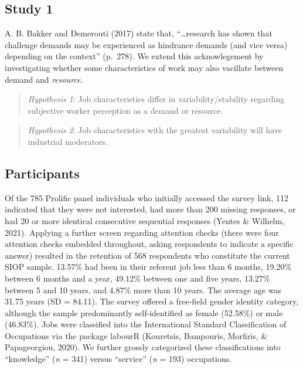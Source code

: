 \documentclass[
  english,
  man]{apa6}
\begin{document}
\hypertarget{study-1}{%
\subsection{Study 1}\label{study-1}}

A. B. Bakker and Demerouti (2017) state that, ``\ldots research has shown that challenge demands may be experienced as hindrance demands (and vice versa) depending on the context'' (p.~278). We extend this acknowlegement by investigating whether some characteristics of work may also vacillate between demand and \emph{resource}.

\begin{quote}
\emph{Hypothesis 1}: Job characteristics differ in variability/stability regarding subjective worker perception as a demand or resource.
\end{quote}

\begin{quote}
\emph{Hypothesis 2}: Job characteristics with the greatest variability will have industrial moderators.
\end{quote}

\hypertarget{participants}{%
\subsection{Participants}\label{participants}}

Of the 785 Prolific panel individuals who initially accessed the survey link, 112 indicated that they were not interested, had more than 200 missing responses, or had 20 or more identical consecutive sequential responses (Yentes \& Wilhelm, 2021). Applying a further screen regarding attention checks (there were four attention checks embedded throughout, asking respondents to indicate a specific answer) resulted in the retention of 568 respondents who constitute the current SIOP sample. 13.57\% had been in their referent job less than 6 months, 19.20\% between 6 months and a year, 49.12\% between one and five years, 13.27\% between 5 and 10 years, and 4.87\% more than 10 years. The average age was 31.75 years (SD = 84.11). The survey offered a free-field gender identity category, although the sample predominantly self-identified as female (52.58\%) or male (46.83\%). Jobs were classified into the International Standard Classification of Occupations via the package labourR (Kouretsis, Bampouris, Morfiris, \& Papageorgiou, 2020). We further grossly categorized these classifications into ``knowledge'' (\emph{n} = 341) versus ``service'' (\emph{n} = 193) occupations.
\end{document}

